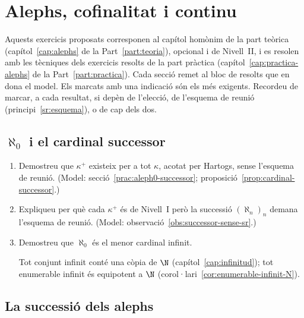 \chapter{Alephs, cofinalitat i continu}\label{cap:exercicis-alephs}

Aquests exercicis proposats corresponen al capítol homònim de la part teòrica (capítol~\ref{cap:alephs} de la Part~\ref{part:teoria}), opcional i de Nivell~II, i es resolen amb les tècniques dels exercicis resolts de la part pràctica (capítol~\ref{cap:practica-alephs} de la Part~\ref{part:practica}). Cada secció remet al bloc de resolts que en dona el model. Els marcats amb una indicació són els més exigents. Recordeu de marcar, a cada resultat, si depèn de l'elecció, de l'esquema de reunió (principi~\ref{sr:esquema}), o de cap dels dos.

\section{\texorpdfstring{\(\aleph_0\)}{aleph 0} i el cardinal successor}

\begin{enumerate}
  \item Demostreu que \(\kappa^+\) existeix per a tot \(\kappa\), acotat per Hartogs, sense l'esquema de reunió. (Model: secció~\ref{prac:aleph0-successor}; proposició~\ref{prop:cardinal-successor}.)

  \item Expliqueu per què cada \(\kappa^+\) és de Nivell~I però la successió \((\aleph_n)_n\) demana l'esquema de reunió. (Model: observació~\ref{obs:successor-sense-sr}.)

  \item Demostreu que \(\aleph_0\) és el menor cardinal infinit. \begin{indicacio}Tot conjunt infinit conté una còpia de \(\N\) (capítol~\ref{cap:infinitud}); tot enumerable infinit és equipotent a \(\N\) (corol·lari~\ref{cor:enumerable-infinit-N}).\end{indicacio}
\end{enumerate}

\section{La successió dels alephs}

